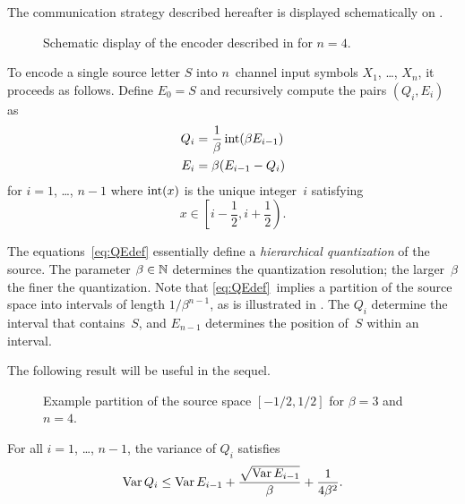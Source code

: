 The communication strategy described hereafter is displayed schematically on
.
\begin{figure}
  \begin{center}
    
  \end{center}
  \caption{Schematic display of the encoder described in  for
  $n = 4$.}
  \label{fig:1nencoding}
\end{figure}
To encode a single source letter $S$ into $n$~channel input symbols $X_1$,
\dots, $X_n$, it proceeds as follows. Define $E_0 = S$ and recursively compute
the pairs $(Q_i, E_i)$ as
\begin{subequations}\label{eq:QEdef}
\begin{align}
  Q_i &= \frac{1}{\beta}\operatorname{int}(\beta E_{i-1}) \label{eq:QEdefA} \\
  E_i &= \beta (E_{i-1} - Q_i) \label{eq:QEdefB}
\end{align}
\end{subequations}
for $i = 1$, \dots, $n-1$ where $\operatorname{int}(x)$ is the unique integer~$i$ satisfying
\begin{equation*}
  x \in \left[i - \frac12, i +\frac12\right).
\end{equation*}

The equations~\ref{eq:QEdef} essentially define a \emph{hierarchical
quantization} of the source.  The parameter $\beta \in {\mathbb{N}}$ determines the
quantization resolution; the larger~$\beta$ the finer the quantization.
Note that \eqref{eq:QEdef}~implies a partition of the source space into
intervals of length $1/\beta^{n-1}$, as is illustrated in
. The $Q_i$ determine the interval that contains~$S$,
and $E_{n-1}$ determines the position of~$S$ within an interval. 

The following result will be useful in the sequel.

\begin{figure}
  \begin{center}
    
  \end{center}
  \caption{Example partition of the source space $[-1/2,1/2]$ for $\beta = 3$
  and $n = 4$. }
  \label{fig:sourcepartition}
\end{figure}



\begin{lemma}
  \label{lem:Qvarbound}
  For all $i = 1$, \dots, $n-1$, the variance of $Q_i$ satisfies
  \begin{equation*}
    \operatorname{Var} Q_i \le \operatorname{Var} E_{i-1} + \frac{\sqrt{\operatorname{Var} E_{i-1}}}{\beta} +
    \frac{1}{4\beta^2}.
  \end{equation*}
\end{lemma}

